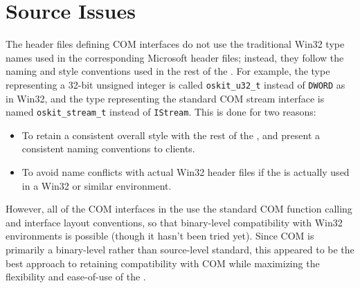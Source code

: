 \section{Source Issues}

The \oskit{} header files defining COM interfaces
do not use the traditional Win32 type names
used in the corresponding Microsoft header files;
instead, they follow the naming and style conventions
used in the rest of the \oskit{}.
For example, the type representing a 32-bit unsigned integer
is called \texttt{oskit_u32_t} instead of \texttt{DWORD} as in Win32,
and the type representing the standard COM stream interface
is named \texttt{oskit_stream_t} instead of \texttt{IStream}.
This is done for two reasons:
\begin{itemize}
\item	To retain a consistent overall style with the rest of the \oskit{},
	and present a consistent naming conventions to clients.
\item	To avoid name conflicts with actual Win32 header files
	if the \oskit{} is actually used in a Win32 or similar environment.
\end{itemize}

However, all of the COM interfaces in the \oskit{}
use the standard COM function calling and interface layout conventions,
so that binary-level compatibility with Win32 environments is possible
(though it hasn't been tried yet).
Since COM is primarily a binary-level rather than source-level standard,
this appeared to be the best approach
to retaining compatibility with COM
while maximizing the flexibility and ease-of-use of the \oskit.


